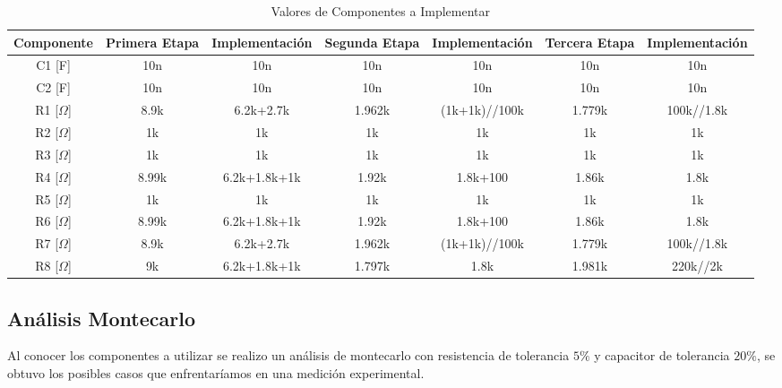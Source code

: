 \begin{table}[H]
\centering
\begin{tabular}{@{}ccccccc@{}}
\toprule
Componente & Primera Etapa & Implementación & Segunda Etapa & Implementación & Tercera Etapa & Implementación \\ \midrule
C1 [F]         & 10n           & 10n            & 10n           & 10n            & 10n           & 10n            \\
C2 [F]         & 10n           & 10n            & 10n           & 10n            & 10n           & 10n            \\
R1 [$\Omega$]         & 8.9k          & 6.2k+2.7k      & 1.962k        & (1k+1k)//100k  & 1.779k        & 100k//1.8k     \\
R2 [$\Omega$]        & 1k            & 1k             & 1k            & 1k             & 1k            & 1k             \\
R3 [$\Omega$]        & 1k            & 1k             & 1k            & 1k             & 1k            & 1k             \\
R4 [$\Omega$]        & 8.99k         & 6.2k+1.8k+1k   & 1.92k         & 1.8k+100       & 1.86k         & 1.8k           \\
R5 [$\Omega$]        & 1k            & 1k             & 1k            & 1k             & 1k            & 1k             \\
R6 [$\Omega$]        & 8.99k         & 6.2k+1.8k+1k   & 1.92k         & 1.8k+100       & 1.86k         & 1.8k           \\
R7 [$\Omega$]        & 8.9k          & 6.2k+2.7k      & 1.962k        & (1k+1k)//100k  & 1.779k        & 100k//1.8k     \\
R8 [$\Omega$]        & 9k            & 6.2k+1.8k+1k   & 1.797k        & 1.8k           & 1.981k        & 220k//2k       \\ \bottomrule
\end{tabular}
\label{ej4valr}
\caption{Valores de Componentes a Implementar}
\end{table}

\subsection{Análisis Montecarlo}

Al conocer los componentes a utilizar se realizo un análisis de montecarlo con resistencia de tolerancia $5\%$ y capacitor de tolerancia $20\%$, se obtuvo los posibles casos que enfrentaríamos en una medición experimental.


